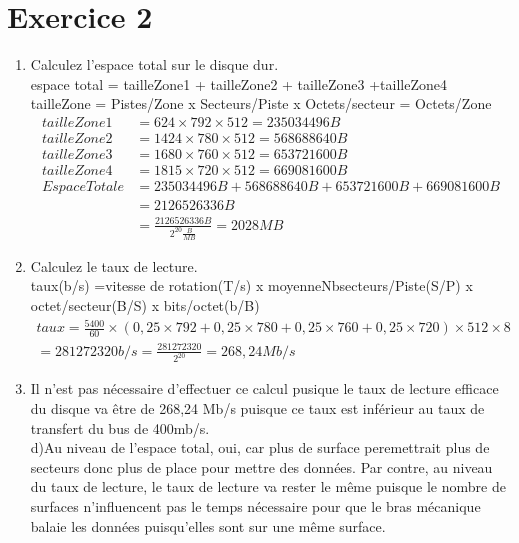 \documentclass{article}
\begin{document}
\section*{Exercice 2}
\begin{enumerate}[label=\alph*)]
	\item Calculez l'espace total sur le disque dur. \\
	      espace total = tailleZone1 + tailleZone2 + tailleZone3 +tailleZone4 \\
	      tailleZone = Pistes/Zone x Secteurs/Piste x Octets/secteur = Octets/Zone \\
	      \begin{align*}
	      	tailleZone1  & = 624\times 792\times 512 = 235 034 496 B                 \\
	      	tailleZone2  & =1424\times 780\times 512 = 568 688 640 B                 \\
	      	tailleZone3  & =1680\times 760\times 512 = 653 721 600B                  \\
	      	tailleZone4  & =1815\times 720\times 512 = 669 081 600 B                 \\
	      	EspaceTotale & = 235 034 496 B + 568 688 640 B +
	      	653 721 600B +  669 081 600 B \\
	      	             & =  2 126 526 336 B                                        \\
	      	             & =  \frac {2 126 526 336 B}{2^{20}\frac{B}{MB}} =  2028 MB
	      \end{align*}
	\item Calculez le taux de lecture. \\
	      taux(b/s) =vitesse de rotation(T/s) x moyenneNbsecteurs/Piste(S/P) x octet/secteur(B/S) x bits/octet(b/B)
	      \begin{align*}
	      	taux ={ \frac{5400}{60}\times( 0,25\times792+0,25\times780+0,25\times760+0,25\times720)\times512\times8} \\
	      	= 281 272 320 b/s =  \frac {281 272 320}{2^{20}}= 268,24 Mb/s
	      \end{align*}
	\item Il n'est pas nécessaire d'effectuer ce calcul pusique le taux de lecture efficace du disque va être de 268,24 Mb/s  puisque ce taux est inférieur au taux de transfert du bus de 400mb/s. \\
	      d)Au niveau de l'espace total, oui, car plus de surface peremettrait plus de secteurs donc plus de place pour mettre des données. Par contre, au niveau du taux de lecture, le taux de lecture va rester le même puisque le nombre de surfaces n'influencent pas le temps nécessaire pour que le bras mécanique balaie les données puisqu'elles sont sur une même surface.
\end{enumerate}
\end{document}
